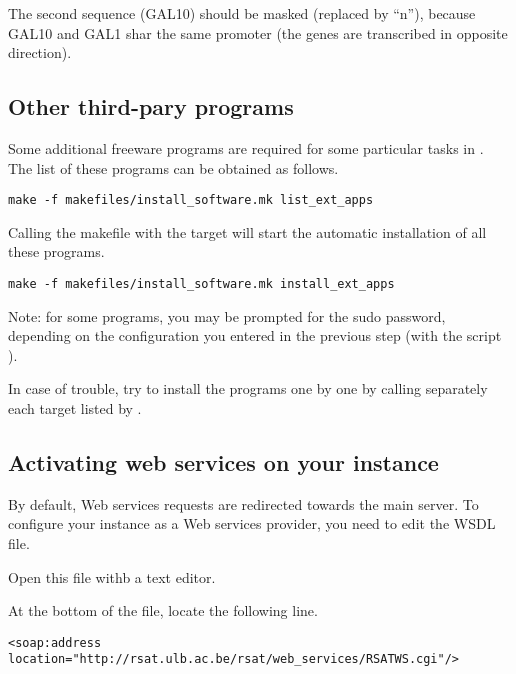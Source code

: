 \documentclass[12pt,a4paper, oneside]{scrreprt} %
\begin{document}
The second sequence (GAL10) should be masked (replaced by ``n''),
because GAL10 and GAL1 shar the same promoter (the genes are
transcribed in opposite direction).

\subsection{Other third-pary programs}

Some additional freeware programs are required for some particular
tasks in \RSAT. The list of these programs can be obtained as follows.

\begin{lstlisting}
make -f makefiles/install_software.mk list_ext_apps
\end{lstlisting}

Calling the makefile with the target  will
start the automatic installation of all these programs. 

\begin{lstlisting}
make -f makefiles/install_software.mk install_ext_apps
\end{lstlisting}

Note: for some programs, you may be prompted for the sudo password,
depending on the configuration you entered in the previous step (with
the script ).

In case of trouble, try to install the programs one by one by calling
separately each target listed by .



\subsection{Activating web services on your \RSAT instance}

By default, Web services requests are redirected towards the main
\RSAT server. To configure your \RSAT instance as a Web services
provider, you need to edit the WSDL file.

Open this file withb a text editor.


At the bottom of the file, locate the following line.

\begin{footnotesize}
\begin{verbatim}
<soap:address location="http://rsat.ulb.ac.be/rsat/web_services/RSATWS.cgi"/>
\end{verbatim}
\end{footnotesize}
\end{document}
